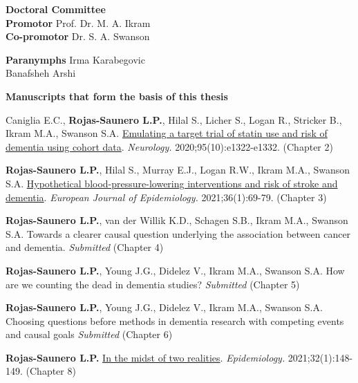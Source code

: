  

\newpage
\thispagestyle{empty}
\textbf{Doctoral Committee} \\
\textbf{Promotor}\phantom{mbersa:}     Prof. Dr. M. A. Ikram   \\ 
\textbf{Co-promotor} \phantom{er::} Dr. S. A. Swanson  

\vspace*{\fill}
 
\textbf{Paranymphs }    Irma Karabegovic   \\ 
\phantom{Paranymphs ab} Banafsheh Arshi    
                    
\newpage  
\thispagestyle{empty}
\textbf{Manuscripts that form the basis of this thesis}

Caniglia E.C., \textbf{Rojas-Saunero L.P.}, Hilal S., Licher S., Logan
R., Stricker B., Ikram M.A., Swanson S.A.
\href{https://pubmed.ncbi.nlm.nih.gov/32753444/}{Emulating a target
trial of statin use and risk of dementia using cohort data}.
\emph{Neurology.} 2020;95(10):e1322-e1332. (Chapter 2)

\textbf{Rojas-Saunero L.P.}, Hilal S., Murray E.J., Logan R.W., Ikram
M.A., Swanson S.A.
\href{https://pubmed.ncbi.nlm.nih.gov/33247419/}{Hypothetical
blood-pressure-lowering interventions and risk of stroke and dementia}.
\emph{European Journal of Epidemiology.} 2021;36(1):69-79. (Chapter 3)

\textbf{Rojas-Saunero L.P.}, van der Willik K.D., Schagen S.B., Ikram
M.A., Swanson S.A. Towards a clearer causal question underlying the
association between cancer and dementia. \emph{Submitted} (Chapter 4)

\textbf{Rojas-Saunero L.P.}, Young J.G., Didelez V., Ikram M.A., Swanson
S.A. How are we counting the dead in dementia studies? \emph{Submitted}
(Chapter 5)

\textbf{Rojas-Saunero L.P.}, Young J.G., Didelez V., Ikram M.A., Swanson
S.A. Choosing questions before methods in dementia research with
competing events and causal goals \emph{Submitted} (Chapter 6)

\textbf{Rojas-Saunero L.P.}
\href{https://pubmed.ncbi.nlm.nih.gov/33122553/}{In the midst of two
realities}. \emph{Epidemiology.} 2021;32(1):148-149. (Chapter 8)

\newpage
\thispagestyle{empty}
\tableofcontents

